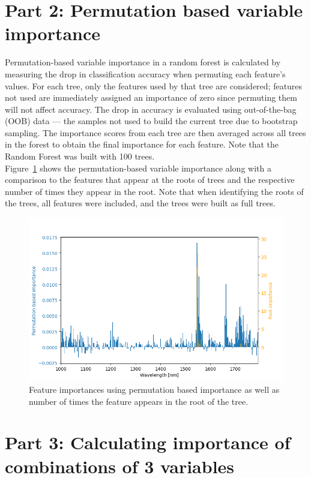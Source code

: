 \documentclass[9pt]{IEEEtran}
\begin{document}
\section{Part 2: Permutation based variable importance}
Permutation-based variable importance in a random forest is calculated by measuring the drop in 
classification accuracy when permuting each feature's values. For each tree, only the features used by 
that tree are considered; features not used are immediately assigned an importance of zero since permuting 
them will not affect accuracy. The drop in accuracy is evaluated using out-of-the-bag (OOB) data — 
the samples not used to build the current tree due to bootstrap sampling. The importance scores from each 
tree are then averaged across all trees in the forest to obtain the final importance for each feature. Note that 
the Random Forest was built with 100 trees. 
\\

Figure~\ref{fig:importances} shows the permutation-based variable importance along with a comparison to the 
features that appear at the roots of trees and the respective number of times they appear in the root.
Note that when identifying the roots of the trees, all features were included, and the trees were built as full trees.

\begin{figure}[h]
    \centering
    \includegraphics[width=0.95\columnwidth]{figures/importances.png}
    \caption{Feature importances using permutation based importance as well as number of times the feature
    appears in the root of the tree.}
    \label{fig:importances}
\end{figure}

\section{Part 3: Calculating importance of combinations of 3 variables}
\end{document}

